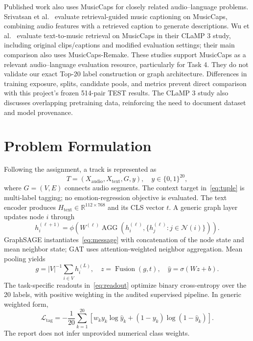 \documentclass[conference]{IEEEtran}
\begin{document}
Published work also uses MusicCaps for closely related audio--language problems. Srivatsan et al.~\cite{rgmc} evaluate retrieval-guided music captioning on MusicCaps, combining audio features with a retrieved caption to generate descriptions. Wu et al.~\cite{clamp3} evaluate text-to-music retrieval on MusicCaps in their CLaMP 3 study, including original clips/captions and modified evaluation settings; their main comparison also uses MusicCaps-Remake. These studies support MusicCaps as a relevant audio--language evaluation resource, particularly for Task 4. They do not validate our exact Top-20 label construction or graph architecture. Differences in training exposure, splits, candidate pools, and metrics prevent direct comparison with this project's frozen 514-pair TEST results. The CLaMP 3 study also discusses overlapping pretraining data, reinforcing the need to document dataset and model provenance.

\section{Problem Formulation}\label{sec:problem}
Following the assignment, a track is represented as
\begin{equation}
T=(X_{\mathrm{audio}},X_{\mathrm{text}},G,y),\quad y\in\{0,1\}^{20},
\label{eq:tuple}
\end{equation}
where $G=(V,E)$ connects audio segments. The context target in~\eqref{eq:tuple} is multi-label tagging; no emotion-regression objective is evaluated. The text encoder produces $H_{\mathrm{text}}\in\mathbb{R}^{112\times768}$ and its CLS vector $t$. A generic graph layer updates node $i$ through
\begin{equation}
h_i^{(\ell+1)}=\phi\!\left(W^{(\ell)}\operatorname{AGG}\left(h_i^{(\ell)},\{h_j^{(\ell)}:j\in\mathcal N(i)\}\right)\right).
\label{eq:message}
\end{equation}
GraphSAGE instantiates~\eqref{eq:message} with concatenation of the node state and mean neighbor state; GAT uses attention-weighted neighbor aggregation. Mean pooling yields
\begin{equation}
g=|V|^{-1}\sum_{i\in V}h_i^{(L)},\quad z=\operatorname{Fusion}(g,t),\quad \hat y=\sigma(Wz+b).
\label{eq:readout}
\end{equation}
The task-specific readouts in~\eqref{eq:readout} optimize binary cross-entropy over the 20 labels, with positive weighting in the audited supervised pipeline. In generic weighted form,
\begin{equation}
\mathcal L_{\mathrm{tag}}=-\frac1{20}\sum_{k=1}^{20}\left[w_k y_k\log\hat y_k+(1-y_k)\log(1-\hat y_k)\right].
\label{eq:bce}
\end{equation}
The report does not infer unprovided numerical class weights.
\end{document}
